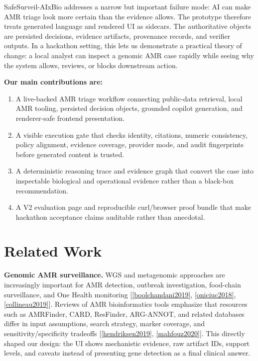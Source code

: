 \documentclass[11pt, letterpaper]{article}
\newcommand{\project}{SafeSurveil-AIxBio}
\begin{document}
\project{} addresses a narrow but important failure mode: AI can make AMR triage look more certain than the evidence allows. The prototype therefore treats generated language and rendered UI as sidecars. The authoritative objects are persisted decisions, evidence artifacts, provenance records, and verifier outputs. In a hackathon setting, this lets us demonstrate a practical theory of change: a local analyst can inspect a genomic AMR case rapidly while seeing why the system allows, reviews, or blocks downstream action.

\textbf{Our main contributions are:}
\begin{enumerate}
    \item A live-backed AMR triage workflow connecting public-data retrieval, local AMR tooling, persisted decision objects, grounded copilot generation, and renderer-safe frontend presentation.
    \item A visible execution gate that checks identity, citations, numeric consistency, policy alignment, evidence coverage, provider mode, and audit fingerprints before generated content is trusted.
    \item A deterministic reasoning trace and evidence graph that convert the case into inspectable biological and operational evidence rather than a black-box recommendation.
    \item A V2 evaluation page and reproducible curl/browser proof bundle that make hackathon acceptance claims auditable rather than anecdotal.
\end{enumerate}

\section{Related Work}

\textbf{Genomic AMR surveillance.} WGS and metagenomic approaches are increasingly important for AMR detection, outbreak investigation, food-chain surveillance, and One Health monitoring [\ref{boolchandani2019}, \ref{oniciuc2018}, \ref{collineau2019}]. Reviews of AMR bioinformatics tools emphasize that resources such as AMRFinder, CARD, ResFinder, ARG-ANNOT, and related databases differ in input assumptions, search strategy, marker coverage, and sensitivity/specificity tradeoffs [\ref{hendriksen2019}, \ref{mahfouz2020}]. This directly shaped our design: the UI shows mechanistic evidence, raw artifact IDs, support levels, and caveats instead of presenting gene detection as a final clinical answer.
\end{document}
